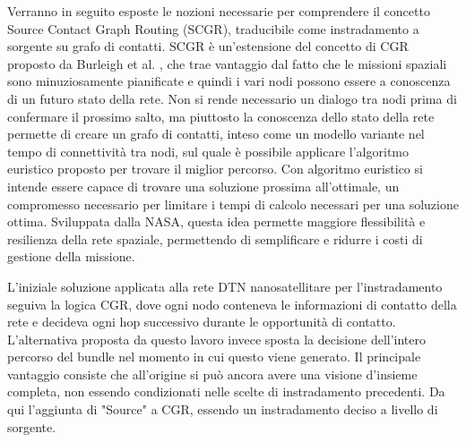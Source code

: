 \documentclass[a4paper]{article}
\begin{document}
		Verranno in seguito esposte le nozioni necessarie per comprendere il concetto Source Contact Graph Routing (SCGR), traducibile come instradamento a sorgente su grafo di contatti. SCGR è un'estensione del concetto di CGR proposto da Burleigh et al. \cite{burleigh2010contact}, che trae vantaggio dal fatto che le missioni spaziali sono minuziosamente pianificate e quindi i vari nodi possono essere a conoscenza di un futuro stato della rete. Non si rende necessario un dialogo tra nodi prima di confermare il prossimo salto, ma piuttosto la conoscenza dello stato della rete permette di creare un grafo di contatti, inteso come un modello variante nel tempo di connettività tra nodi, sul quale è possibile applicare l'algoritmo euristico proposto per trovare il miglior percorso. Con algoritmo euristico si intende essere capace di trovare una soluzione prossima all'ottimale, un compromesso necessario per limitare i tempi di calcolo necessari per una soluzione ottima. Sviluppata dalla NASA, questa idea permette maggiore flessibilità e resilienza della rete spaziale, permettendo di semplificare e ridurre i costi di gestione della missione.
		
		L'iniziale soluzione applicata alla rete DTN nanosatellitare per l'instradamento seguiva la logica CGR, dove ogni nodo conteneva le informazioni di contatto della rete e decideva ogni hop successivo durante le opportunità di contatto. L'alternativa proposta da questo lavoro invece sposta la decisione dell'intero percorso del bundle nel momento in cui questo viene generato. Il principale vantaggio consiste che all'origine si può ancora avere una visione d'insieme completa, non essendo condizionati nelle scelte di instradamento precedenti. Da qui l'aggiunta di "Source" a CGR, essendo un instradamento deciso a livello di sorgente. 
		
\end{document}
